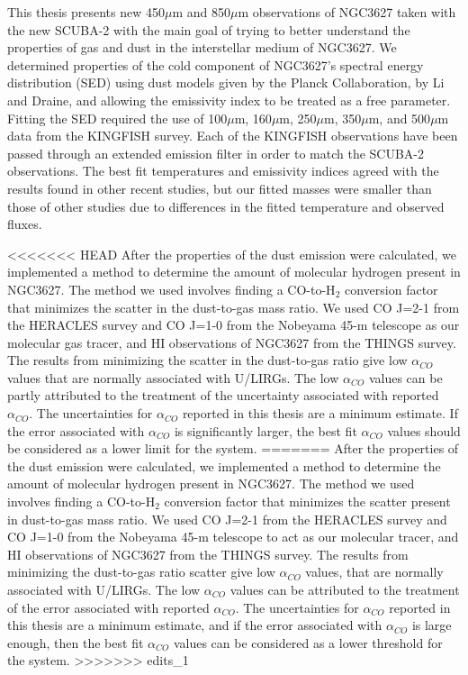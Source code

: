 This thesis presents new 450$\mu$m and 850$\mu$m observations of NGC3627 taken with the new SCUBA-2 with the main goal of trying to better understand the properties of gas and dust in the interstellar medium of NGC3627.  We determined properties of the cold component of NGC3627's spectral energy distribution (SED) using dust models given by the Planck Collaboration, by Li and Draine, and allowing the emissivity index to be treated as a free parameter.  Fitting the SED required the use of 100$\mu$m, 160$\mu$m, 250$\mu$m, 350$\mu$m, and 500$\mu$m data from the KINGFISH survey.  Each of the KINGFISH observations have been passed through an extended emission filter in order to match the SCUBA-2 observations.  The best fit temperatures and emissivity indices agreed with the results found in other recent studies, but our fitted masses were smaller than those of other studies due to differences in the fitted temperature and observed fluxes.

<<<<<<< HEAD
After the properties of the dust emission were calculated, we implemented a method to determine the amount of molecular hydrogen present in NGC3627.  The method we used involves finding a CO-to-H$_2$ conversion factor that minimizes the scatter in the dust-to-gas mass ratio. We used CO J=2-1 from the HERACLES survey and CO J=1-0 from the Nobeyama 45-m telescope as our molecular gas tracer, and HI observations of NGC3627 from the THINGS survey.  The results from minimizing the scatter in the dust-to-gas ratio give low $\alpha_{CO}$ values that are normally associated with U/LIRGs.  The low $\alpha_{CO}$ values can be partly attributed to the treatment of the uncertainty associated with reported $\alpha_{CO}$.  The uncertainties for $\alpha_{CO}$ reported in this thesis are a minimum estimate.  If the error associated with $\alpha_{CO}$ is significantly larger, the best fit $\alpha_{CO}$ values should be considered as a lower limit for the system.
=======
After the properties of the dust emission were calculated, we implemented a method to determine the amount of molecular hydrogen present in NGC3627.  The method we used involves finding a CO-to-H$_2$ conversion factor that minimizes the scatter present in dust-to-gas mass ratio. We used CO J=2-1 from the HERACLES survey and CO J=1-0 from the Nobeyama 45-m telescope to act as our molecular tracer, and HI observations of NGC3627 from the THINGS survey.  The results from minimizing the dust-to-gas ratio scatter give low $\alpha_{CO}$ values, that are normally associated with U/LIRGs.  The low $\alpha_{CO}$ values can be attributed to the treatment of the error associated with reported $\alpha_{CO}$.  The uncertainties for $\alpha_{CO}$ reported in this thesis are a minimum estimate, and if the error associated with $\alpha_{CO}$ is large enough, then the best fit $\alpha_{CO}$ values can be considered as a lower threshold for the system.
>>>>>>> edits_1
